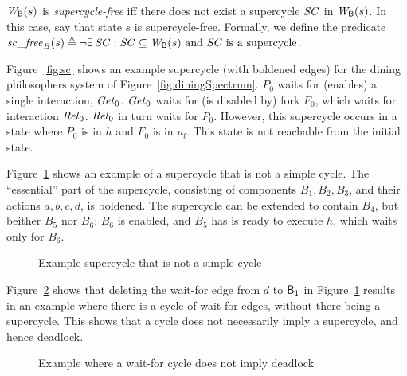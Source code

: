\label{def:supercycle-free}
\label{defn:supercycle-free}
$\mathit{W}_{\mathsf{B}}({s})$ is \emph{supercycle-free} iff 
there does not exist a supercycle $\mathit{SC}$ in $\mathit{W}_{\mathsf{B}}({s})$. 
In this case, say that state $s$ is supercycle-free.
Formally, we define the predicate 
    $\scf{B}{s} \df \neg \ex \SC: \SC \sub \wfg{\B}{s} \ \mbox{and $\SC$ is a supercycle}$. 
\ed

\begin{figure*}[ht]
  \begin{center}
   \scalebox{0.4}{}
   \caption{Example supercycle for dining philosophers system of Figure~\ref{fig:diningSpectrum}.}
   \label{fig:sc}
  \end{center}
\end{figure*}


Figure~\ref{fig:sc} shows an example supercycle (with boldened edges) for the dining philosophers
system of Figure~\ref{fig:diningSpectrum}.
$P_0$ waits for (enables) a single interaction, $\mathit{Get}_0$. 
$\mathit{Get}_0$ waits for (is disabled by) fork $F_0$, which waits for interaction $\mathit{Rel}_0$.
$\mathit{Rel}_0$ in turn waits for $P_0$. However, this supercycle occurs in a state where $P_0$ is in $h$
and $F_0$ is in $u_l$. This state is not reachable from the initial state. 


Figure~\ref{fig:SCnotCycle} shows an example of a supercycle that is not a simple cycle. 
The ``essential'' part of the supercycle, consisting of components $B_1, B_2,B_3$, and their actions $a,b,c,d$, is boldened. 
The supercycle can be extended to contain $B_4$, but beither $B_5$ nor $B_6$: $B_6$ is enabled, and $B_5$ has is ready to execute $h$, which waits
only for $B_6$.
%
\begin{figure}[ht]
\begin{center}
\scalebox{0.6}{}
\caption{Example supercycle that is not a simple cycle}
\label{fig:SCnotCycle}
\end{center}
\end{figure}
%
Figure~\ref{fig:cycleOK} shows that deleting the wait-for edge from $d$ to $\mathsf{B}_1$ in Figure~\ref{fig:SCnotCycle}  results in 
an example where there is
a cycle of wait-for-edges, without there being a supercycle. This shows
that a cycle does not necessarily imply a supercycle, and hence
deadlock. 
%
\begin{figure}[ht]
\begin{center}
\scalebox{0.6}{}
\caption{Example where a wait-for cycle does not imply deadlock}
\label{fig:cycleOK}
\end{center}
\end{figure}


